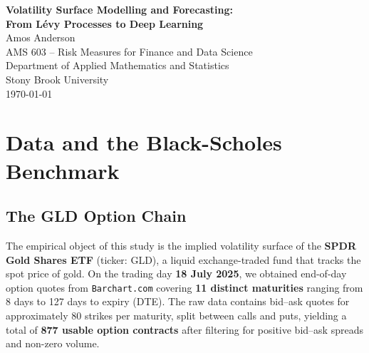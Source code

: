 \documentclass[12pt, a4paper]{article}
\begin{document}

\begin{titlepage}
\vspace*{1cm}
\begin{center}
  {\LARGE\bfseries\color{darkblue}
    Volatility Surface Modelling and Forecasting:\\[0.3cm]
    From L\'{e}vy Processes to Deep Learning}\\[1cm]
  {\large Amos Anderson}\\[0.3cm]
  {\normalsize
    AMS 603 -- Risk Measures for Finance and Data Science\\
    Department of Applied Mathematics and Statistics \\
    Stony Brook University \\ [0.3cm]
    \today
  }\\[0.5em]
\end{center}

\vspace{2cm}

\begin{abstract}
\noindent
Will go here
\end{abstract}
\end{titlepage}

\newpage
\tableofcontents
\newpage




\section{Data and the Black-Scholes Benchmark}
\label{sec:data-bs-benchmark}

\subsection{The GLD Option Chain}
\label{subsec:gld-data}

The empirical object of this study is the implied volatility surface of the \textbf{SPDR Gold Shares ETF} (ticker: GLD), a liquid exchange-traded fund that tracks the spot price of gold. On the trading day \textbf{18 July 2025}, we obtained end-of-day option quotes from \texttt{Barchart.com} covering \textbf{11 distinct maturities} ranging from 8 days to 127 days to expiry (DTE). The raw data contains bid--ask quotes for approximately 80 strikes per maturity, split between calls and puts, yielding a total of \textbf{877 usable option contracts} after filtering for positive bid--ask spreads and non-zero volume.
\end{document}
